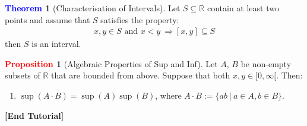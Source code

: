 \documentclass[11pt]{article}
\theoremstyle{definition}
\newcommand{\R}[0]{\mathbb{R}}
\newtheorem{theorem}{\textcolor{blue}{Theorem}}
\theoremstyle{definition}
\newtheorem{prop}{\textcolor{red}{Proposition}}
\theoremstyle{remark}
\begin{document}
\begin{theorem}[Characterisation of Intervals]
	Let $S \subseteq \R$ contain at least two points and assume that $S$ satisfies the property:
	\begin{align} 	
		x, y \in S \text{ and } x < y\ \Rightarrow [x,y] \subseteq S	
	\end{align}
	then $S$ is an interval.
\end{theorem}

\begin{prop}[Algebraic Properties of Sup and Inf]
	Let $A$, $B$ be non-empty subsets of $\R$ that are bounded from above. Suppose that both $x, y \in [0, \infty[$. Then: 
	\begin{enumerate}[noitemsep]
		\item $\sup(A \cdot B) = \sup(A) \sup(B)$, where $A \cdot B := \{ ab\ |\ a \in A, b \in B \}$.
	\end{enumerate}
\end{prop}
\begin{center}
	\textbf{[End Tutorial]}
\end{center}
\end{document}
